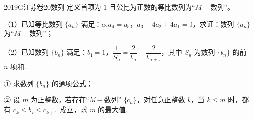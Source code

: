 
\begin{problem}{2019}{G}{江苏卷}{20}{数列}
定义首项为 $1$ 且公比为正数的等比数列为“$M-$数列”。

（1）已知等比数列 $\{a_n\}$ 满足：$a_2a_4=a_5$，$a_3-4a_2+4a_1=0$，求证：数列 $\{a_n\}$ 为“$M-$数列”；

（2）已知数列 $\{b_n\}$ 满足：$b_1=1$，$\dfrac{1}{S_n}=\dfrac{2}{b_n}-\dfrac{2}{b_{n+1}}$，其中 $S_n$ 为数列 $\{b_n\}$ 的前 $n$ 项和.

① 求数列 $\{b_n\}$ 的通项公式；

② 设 $m$ 为正整数，若存在“$M-$数列” $\{c_n\}$，对任意正整数 $k$，当 $k\leqslant m$ 时，都有 $c_k\leqslant b_k\leqslant c_{k+1}$ 成立，求 $m$ 的最大值.
\end{problem}